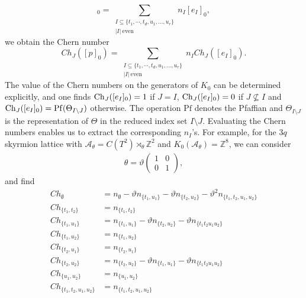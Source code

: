 \documentclass[submission, Phys]{SciPost}
\begin{document}
\begin{equation}
    [p]_0 = \sum_{\substack{I\subseteq\{t_1, \cdots, t_d, u_1, \ldots, u_r\}\\ |I|\ \text{even}}} n_I [e_I]_0,
\end{equation}
we obtain the Chern number
\begin{equation}
    Ch_J([p]_0) = \sum_{\substack{I\subseteq\{t_1, \cdots, t_d, u_1, \ldots, u_r\}\\ |I|\ \text{even}}} n_I Ch_J([e_I]_0).
\end{equation}
The value of the Chern numbers on the generators of $K_0$ can be determined explicitly, and one finds \cite{Prodan2016, Liu2022}
 ${\rm Ch}_{J}([e_I]_0)=1$ if $J=I$,  ${\rm Ch}_{J}([e_I]_0)=0$ if $J \not\subseteq I$ and ${\rm Ch}_{J}([e_I]_0) = \mathrm{Pf}( \Theta_{I\setminus J})$ otherwise.
The operation $\mathrm{Pf}$ denotes the Pfaffian and $\Theta_{I\setminus J}$ is the representation of $\Theta$ in the reduced index set $I\setminus J$.
Evaluating the Chern numbers enables us to extract the corresponding $n_I$'s.
For example, for the $3q$ skyrmion lattice with $\mathcal{A}_\theta=C(T^2)\rtimes_\theta \mathbb{Z}^2$ and $K_0(\mathcal{A}_\theta)=\mathbb{Z}^8$, we can consider
\begin{align}
    \theta = \vartheta \begin{pmatrix}
        1 & 0 \\
        0 & 1
    \end{pmatrix},
\end{align}
and find
\begin{align}
    Ch_{\emptyset} &= n_{\emptyset} - \vartheta n_{\lbrace t_1, u_1\rbrace} - \vartheta n_{\lbrace t_2, u_2 \rbrace} - \vartheta^2 n_{\lbrace t_1, t_2, u_1, u_2 \rbrace} \label{eq:Chernnumbers1}
\\
Ch_{\lbrace t_1,t_2 \rbrace} &= n_{\lbrace t_1,t_2\rbrace} \label{eq:Chernnumbers2}%
\\
Ch_{\lbrace t_1, u_1 \rbrace} &= n_{\lbrace t_1 ,u_1\rbrace} - \vartheta n_{\lbrace t_2, u_2 \rbrace} - \vartheta n_{\lbrace t_1 t_2 u_1 u_2 \rbrace} \label{eq:Chernnumbers3}
\\
Ch_{\lbrace t_1, u_2 \rbrace}&= n_{\lbrace t_1,u_2\rbrace} \label{eq:Chernnumbers4}
\\
Ch_{\lbrace t_2, u_1 \rbrace} &= n_{\lbrace t_2,u_1\rbrace} \label{eq:Chernnumbers5}
\\
Ch_{\lbrace t_2 ,u_2 \rbrace} &=
  n_{\lbrace t_2 ,u_2\rbrace} -\vartheta n_{\lbrace t_1, u_1 \rbrace} - \vartheta n_{\lbrace t_1 t_2 u_1 u_2 \rbrace} \label{eq:Chernnumbers6}
\\
Ch_{\lbrace u_1 , u_2 \rbrace} &= n_{\lbrace u_1 , u_2 \rbrace} \label{eq:Chernnumbers7}
\\
Ch_{\lbrace t_1, t_2, u_1, u_2  \rbrace} &= n_{\lbrace t_1, t_2, u_1, u_2 \rbrace}
\label{eq:Chernnumbers8}
\end{align}
\end{document}
